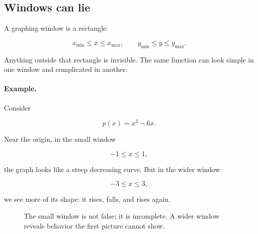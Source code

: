 \subsection{Windows can lie}
\label{subsec:windows-can-lie}

A graphing window is a rectangle:

\[
x_{\min}\le x\le x_{\max},
\qquad
y_{\min}\le y\le y_{\max}.
\]

Anything outside that rectangle is invisible. The same function can look simple in one window and complicated in another.

\paragraph{Example.}
Consider

\[
p(x)=x^3-6x.
\]

Near the origin, in the small window

\[
-1\le x\le 1,
\]

the graph looks like a steep decreasing curve. But in the wider window

\[
-3\le x\le 3,
\]

we see more of its shape: it rises, falls, and rises again.

\begin{figure}[h]
\centering
\begin{minipage}{0.47\textwidth}
\centering
{}
\end{minipage}
\hfill
\begin{minipage}{0.47\textwidth}
\centering
{}
\end{minipage}
\caption{The small window is not false; it is incomplete. A wider window reveals behavior the first picture cannot show.}
\label{fig:window-can-lie-cubic}
\end{figure}

